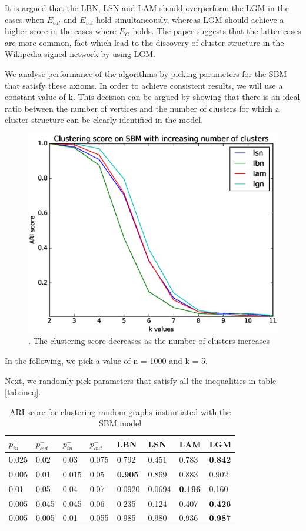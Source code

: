 \documentclass[11pt]{article}
\begin{document}
  It is argued that the LBN, LSN and LAM should overperform the LGM in the cases
  when $E_{bal}$ and $E_{vol}$ hold simultaneously, whereas LGM should achieve 
  a higher score in the cases where $E_G$ holds. The paper suggests that the latter
  cases are more common, fact which lead to the discovery of cluster structure in 
  the Wikipedia signed network by using LGM.

  We analyse performance of the algorithms by picking parameters for the SBM that 
  satisfy these axioms. In order to achieve consistent results, we will
  use a constant value of k. 
  This decision can be argued by showing that there is an ideal ratio between 
  the number of vertices and the number of clusters for which a cluster structure 
  can be clearly identified in the model.

  \begin{figure}[h!]
    \centering
      \includegraphics[width=.5\columnwidth]{exp1.eps}
      \caption{\label{fig:increasingk}. The clustering score decreases as the 
      number of clusters increases}
  \end{figure}

  In the following, we pick a value of n = 1000 and k = 5.

  Next, we randomly pick parameters that satisfy all the inequalities in table \ref{tab:ineq}.

  \begin{table}[!h]
    \centering
    \label{tab:params}
    \begin{tabular}{| l l l l | l | l | l | l |}
      \hline 
      $p_{in}^+$ & $p_{out}^+$ & $p_{in}^- $ & $p_{out}^-$ & LBN & LSN & LAM & \textbf{LGM} \\  
      \hline 
      0.025 & 0.02 & 0.03 & 0.075 &  0.792 & 0.451 & 0.783 & \textbf{0.842} \\
      0.005 & 0.01 & 0.015 & 0.05 & \textbf{0.905} & 0.869 & 0.883 & 0.902 \\  
      0.01 & 0.05 & 0.04 & 0.07 & 0.0920 & 0.0694 & \textbf{0.196} & 0.160 \\ 
      0.005 & 0.045 & 0.045 & 0.06 & 0.235 & 0.124 & 0.407 & \textbf{0.426} \\ 
      0.005 & 0.005 & 0.01 & 0.055 & 0.985 & 0.980 & 0.936 & \textbf{0.987} \\ 
      \hline 
    \end{tabular}
    \caption{ARI score for clustering random graphs instantiated with the SBM model}
  \end{table}
\end{document}
